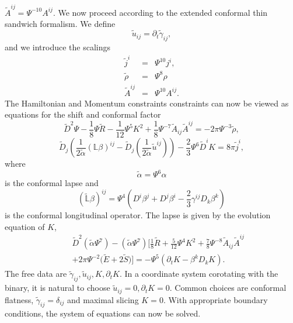 $\tilde{A}^{ij}=\Psi^{-10}A^{ij}$. We now proceed according to the extended conformal thin sandwich formalism. We define 
\begin{equation}
\tilde{u}_{ij}=\partial_t\tilde{\gamma}_{ij},
\end{equation}
and we introduce the scalings
\begin{eqnarray}
\tilde{j}^i &=& \Psi^{10}j^i, \\
\tilde{\rho} &=& \Psi^{8}\rho \\
\tilde{A}^{ij} &=& \Psi^{10} A^{ij}. 
\end{eqnarray}
The Hamiltonian and Momentum constraints constraints can now be viewed as equations for the shift and conformal factor
\begin{equation}
\tilde{D}^2\Psi-\frac{1}{8}\Psi\tilde{R}-\frac{1}{12}\Psi^5K^2+\frac{1}{8}\Psi^{-7}\tilde{A}_{ij}\tilde{A}^{ij}=-2\pi\Psi^{-3}\tilde{\rho},
\end{equation}
\begin{equation}
\tilde{D}_j\left(\frac{1}{2\tilde{\alpha}}\left(\mathbb{L}\beta\right)^{ij}-\tilde{D}_j\left(\frac{1}{2\tilde{\alpha}}\tilde{u}^{ij}\right)\right)-\frac{2}{3}\Psi^6\tilde{D}^iK=8\pi\tilde{j}^i,
\end{equation}
where
\begin{equation}
\tilde{\alpha}=\Psi^6\alpha
\end{equation}
is the conformal lapse and 
\begin{equation}
\left(\tilde{\mathbb{L}}\beta\right)^{ij}=\Psi^4\left(D^i\beta^j+D^j\beta^i-\frac{2}{3}\gamma^{ij}D_k\beta^k\right)
\end{equation}
is the conformal longitudinal operator. The lapse is given by the evolution equation of $K$,
\begin{eqnarray}
&&\tilde{D}^2\left(\tilde{\alpha}\Psi^7\right) -
\left(\tilde{\alpha}\Psi^7\right)\bigg[\frac{1}{8}\tilde{R}+\frac{5}{12}\Psi^4K^2+\frac{7}{8}\Psi^{-8}\tilde{A}_{ij}\tilde{A}^{ij}\nonumber \\
\label{eq:XCTS-Lapse}
&&+2\pi\Psi^{-2}\big(\tilde{E}+2\tilde{S}\big)\bigg]=-\Psi^5\left(\partial_{t}K
- \beta^{k}D_kK\right).
\end{eqnarray}
The free data are $\tilde{\gamma}_{ij},\tilde{u}_{ij},K,\partial_tK$. In a coordinate system corotating with the binary, it is natural to choose $\tilde{u}_{ij}=0, \partial_tK=0$. Common choices are conformal flatness, $\tilde{\gamma}_{ij}=\delta_{ij}$ and maximal slicing $K=0$. With appropriate boundary conditions, the system of equations can now be solved.

